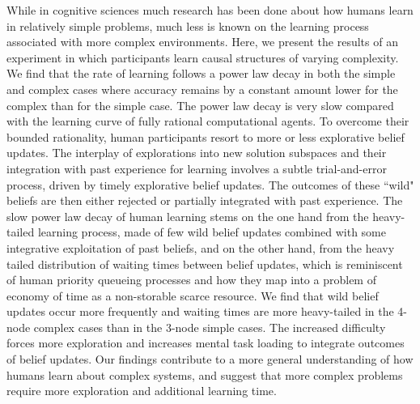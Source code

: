 While in cognitive sciences much research has been done about how humans learn in relatively simple problems, much less is known on the learning process associated with more complex environments. Here, we present the results of an experiment in which participants learn causal structures of varying complexity. We find that the rate of learning follows a power law decay in both the simple and complex cases where accuracy remains by a constant amount lower for the complex than for the simple case. The power law decay is very slow compared with the learning curve of fully rational computational agents. To overcome their bounded rationality, human participants resort to more or less explorative belief updates. The interplay of explorations into new solution subspaces and their integration with past experience for learning involves a subtle trial-and-error process, driven by timely explorative belief updates. The outcomes of these ``wild" beliefs are then either rejected or partially integrated with past experience. The slow power law decay of human learning stems on the one hand from the heavy-tailed learning process, made of few wild belief updates combined with some integrative exploitation of past beliefs, and on the other hand, from the heavy tailed distribution of waiting times between belief updates, which is reminiscent of human priority queueing processes and how they map into a problem of economy of time as a non-storable scarce resource. We find that wild belief updates occur more frequently and waiting times are more heavy-tailed in the 4-node complex cases than in the 3-node simple cases. The increased difficulty forces more exploration and increases mental task loading to integrate outcomes of belief updates. Our findings contribute to a more general understanding of how humans learn about complex systems, and suggest that more complex problems require more exploration and additional learning time.